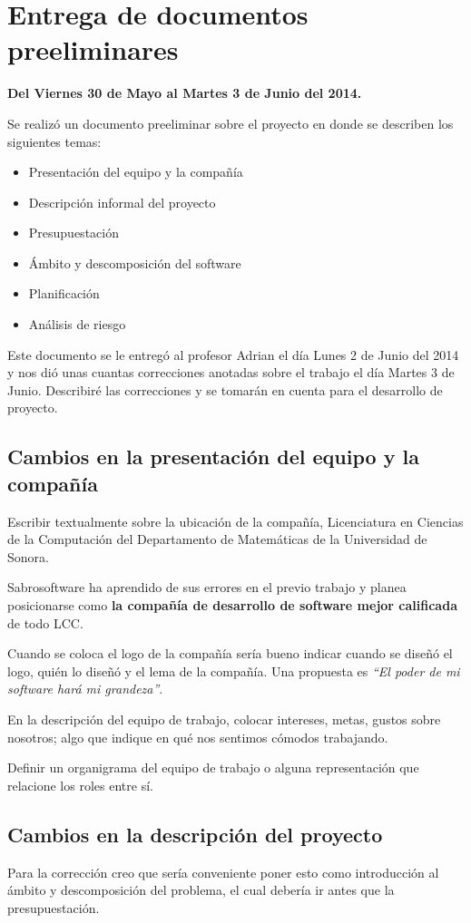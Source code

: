 \documentclass[letterpaper]{article}
\begin{document}
\section{Entrega de documentos preeliminares}
\textbf{Del Viernes 30 de Mayo al Martes 3 de Junio del 2014.}

Se realizó un documento preeliminar sobre el proyecto en donde se describen los siguientes temas:

\begin{itemize}
\item Presentación del equipo y la compañía
\item Descripción informal del proyecto
\item Presupuestación
\item Ámbito y descomposición del software
\item Planificación
\item Análisis de riesgo
\end{itemize}

Este documento se le entregó al profesor Adrian el día Lunes 2 de Junio del 2014 y nos dió unas cuantas correcciones anotadas sobre el trabajo el día Martes 3 de Junio. Describiré las correcciones y se tomarán en cuenta para el desarrollo de proyecto.

\subsection{Cambios en la presentación del equipo y la compañía}
Escribir textualmente sobre la ubicación de la compañía, Licenciatura en Ciencias de la Computación del Departamento de Matemáticas de la Universidad de Sonora.

Sabrosoftware ha aprendido de sus errores en el previo trabajo y planea posicionarse como \textbf{la compañía de desarrollo de software mejor calificada} de todo LCC.

Cuando se coloca el logo de la compañía sería bueno indicar cuando se diseñó el logo, quién lo diseñó y el lema de la compañía. Una propuesta es \emph{``El poder de mi software hará mi grandeza''}.

En la descripción del equipo de trabajo, colocar intereses, metas, gustos sobre nosotros; algo que indique en qué nos sentimos cómodos trabajando.

Definir un organigrama del equipo de trabajo o alguna representación que relacione los roles entre sí.

\subsection{Cambios en la descripción del proyecto}
Para la corrección creo que sería conveniente poner esto como introducción al ámbito y descomposición del problema, el cual debería ir antes que la presupuestación.
\end{document}
